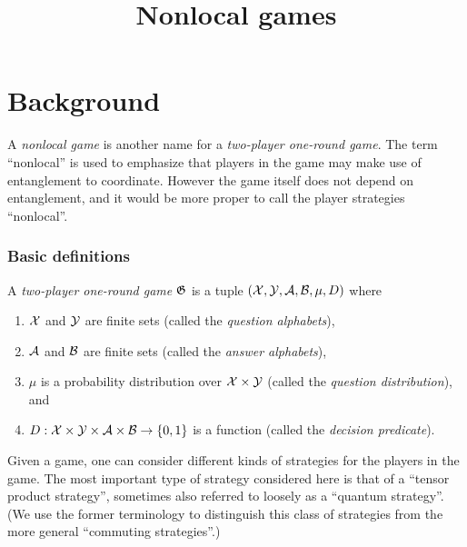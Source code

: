 



\part{Background}
\label{book-part-background}


\title{Nonlocal games}
\label{nonlocalgames}

\maketitle

\label{section-phantom}

\tableofcontents

A \emph{nonlocal game} is another name for a \emph{two-player one-round game}. The term ``nonlocal'' is used to emphasize that players in the game may make use of entanglement to coordinate. However the game itself does not depend on entanglement, and it would be more proper to call the player strategies ``nonlocal''.  

\section{Basic definitions}
\label{section-strat}

\begin{definition}
  \label{definition-game}
  A \emph{two-player one-round game} $\game$ is a tuple
  $(\cal{X}, \cal{Y}, \cal{A}, \cal{B}, \mu, D)$ where
  \begin{enumerate}
  \item $\cal{X}$ and $\cal{Y}$ are finite sets (called the \emph{question
      alphabets}),
  \item $\cal{A}$ and $\cal{B}$ are finite sets (called the \emph{answer
      alphabets}),
  \item $\mu$ is a probability distribution over $\cal{X} \times \cal{Y}$
    (called the \emph{question distribution}), and
  \item $D: \cal{X} \times \cal{Y} \times \cal{A} \times \cal{B} \to \{0,1\}$ is
    a function (called the \emph{decision predicate}).
  \end{enumerate}
\end{definition}

Given a game, one can consider different kinds of strategies for the players in the game. The most important type of strategy considered here is that of a ``tensor product strategy'', sometimes also referred to loosely as a ``quantum strategy''. (We use the former terminology to distinguish this class of strategies from the more general ``commuting strategies''.)


